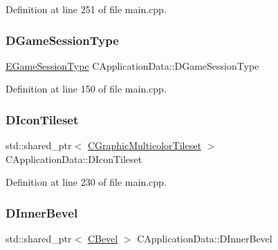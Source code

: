 Definition at line 251 of file main.\+cpp.

\hypertarget{classCApplicationData_acd2cc6f5bbb325532c21afc38241c3de}{}\label{classCApplicationData_acd2cc6f5bbb325532c21afc38241c3de} 
\subsubsection{\texorpdfstring{D\+Game\+Session\+Type}{DGameSessionType}}
{\footnotesize\ttfamily \hyperlink{classCApplicationData_a0ec00515bf6b4b469b43ad62d615e3fa}{E\+Game\+Session\+Type} C\+Application\+Data\+::\+D\+Game\+Session\+Type\hspace{0.3cm}{\ttfamily [protected]}}



Definition at line 150 of file main.\+cpp.

\hypertarget{classCApplicationData_a0577767a7fa045a51654b881608b1e7a}{}\label{classCApplicationData_a0577767a7fa045a51654b881608b1e7a} 
\subsubsection{\texorpdfstring{D\+Icon\+Tileset}{DIconTileset}}
{\footnotesize\ttfamily std\+::shared\+\_\+ptr$<$ \hyperlink{classCGraphicMulticolorTileset}{C\+Graphic\+Multicolor\+Tileset} $>$ C\+Application\+Data\+::\+D\+Icon\+Tileset\hspace{0.3cm}{\ttfamily [protected]}}



Definition at line 230 of file main.\+cpp.

\hypertarget{classCApplicationData_a29a687c44dceb9e87a56d96612d59ab5}{}\label{classCApplicationData_a29a687c44dceb9e87a56d96612d59ab5} 
\subsubsection{\texorpdfstring{D\+Inner\+Bevel}{DInnerBevel}}
{\footnotesize\ttfamily std\+::shared\+\_\+ptr$<$ \hyperlink{classCBevel}{C\+Bevel} $>$ C\+Application\+Data\+::\+D\+Inner\+Bevel\hspace{0.3cm}{\ttfamily [protected]}}



